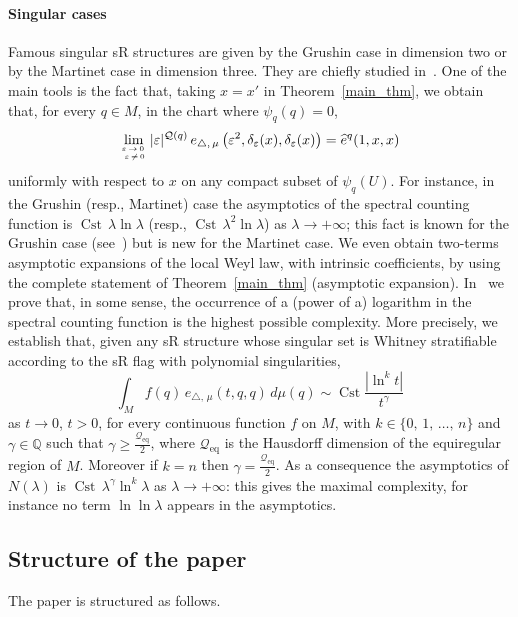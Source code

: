 \documentclass[10pt]{amsart}
\theoremstyle{definition}\newtheorem{defi}[theo]{Definition}\newtheorem{rema}[theo]{Remark}\newtheorem{exam}[theo]{Example}\newtheorem{exem}[theo]{Example}\newtheorem{nota}[theo]{Notation}
\newcommand*\Q{\mathbb{Q}}
\newcommand{\calQ}{\mathcal{Q}}
\DeclareMathOperator{\Cst}{Cst}
\newcommand{\Qeq}{\mathcal{Q}_\mathrm{eq}}
\renewcommand{\geq}{\geqslant}
\begin{document}
\paragraph{Singular cases}
Famous singular sR structures are given by the Grushin case in dimension two or by the Martinet case in dimension three. They are chiefly studied in~\cite{CHT-II}. One of the main tools is the fact that, taking $x=x'$ in Theorem~\ref{main_thm}, we obtain that, for every $q\in M$, in the chart where $\psi_{q}(q)=0$,
\begin{equation*}
\lim_{\varepsilon\,\rightarrow\, 0\,\atop\, \varepsilon\,\neq\, 0} \vert\varepsilon\vert^{\calQ(q)}\, e_{\triangle,\,\mu}\left(\varepsilon^2,\delta_\varepsilon(x),\delta_\varepsilon(x)\right) = \widehat{e}^{q}(1,x,x)
\end{equation*}
uniformly with respect to $x$ on any compact subset of $\psi_{q}(U)$. For instance, in the Grushin (resp., Martinet) case the asymptotics of the spectral counting function is $\Cst\, \lambda\ln\lambda$ (resp., $\Cst\,\lambda^2\ln\lambda$) as $\lambda\rightarrow+\infty$; this fact is known for the Grushin case (see~\cite{Me-Sj-78}) but is new for the Martinet case. We even obtain two-terms asymptotic expansions of the local Weyl law, with intrinsic coefficients, by using the complete statement of Theorem~\ref{main_thm} (asymptotic expansion). In~\cite{CHT-II} we prove that, in some sense, the occurrence of a (power of a) logarithm in the spectral counting function is the highest possible complexity. More precisely, we establish that, given any sR structure whose singular set is Whitney stratifiable according to the sR flag with polynomial singularities,
\[
\int_M f(q)\, e_{\triangle,\,\mu}(t,q,q) \, d\mu (q) \sim \Cst \frac{\left\vert\ln^k t\right\vert}{t^\gamma}
\]
as $t\rightarrow 0$, $t>0$, for every continuous function $f$ on $M$, with $k\in\{0,\,1,\,\ldots,\,n\}$ and $\gamma\in\Q$ such that $\gamma\geq \frac{\Qeq}{2}$, where $\Qeq$ is the Hausdorff dimension of the equiregular region of $M$. Moreover if $k=n$ then $\gamma=\frac{\Qeq}{2}$. As a consequence the asymptotics of $N(\lambda)$ is $\Cst\,\lambda^\gamma\ln^k\lambda$ as $\lambda\rightarrow +\infty$: this gives the maximal complexity, for instance no term $\ln\ln\lambda$ appears in the asymptotics.


\subsection{Structure of the paper}
The paper is structured as follows.
\end{document}
